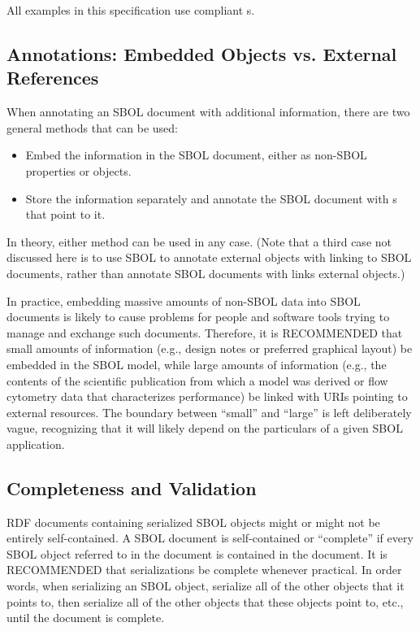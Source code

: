 All examples in this specification use compliant s.

\subsection{Annotations: Embedded Objects vs. External References}

When annotating an SBOL document with additional information, there are
two general methods that can be used:
\begin{itemize}
\item Embed the information in the SBOL document, either as non-SBOL
  properties or  objects.
\item Store the information separately and annotate the SBOL document
  with s that point to it.
\end{itemize}
In theory, either method can be used in any case. (Note that a third case not
discussed here is to use SBOL to annotate external objects with linking
to SBOL documents, rather than annotate SBOL documents with links external objects.)

In practice, 
embedding massive amounts of non-SBOL data into SBOL documents is likely
to cause problems for people and software tools trying to manage and
exchange such documents.  Therefore, it is RECOMMENDED that small amounts of information (e.g., design notes or preferred graphical layout) be embedded in the SBOL model, while large amounts of information (e.g., the contents of the scientific publication from which a model was derived or flow cytometry data that characterizes performance) be linked with URIs pointing to external resources.  The boundary between ``small'' and ``large'' is left deliberately vague, recognizing that it will likely depend on the particulars of a given SBOL application.

\subsection{Completeness and Validation}

RDF documents containing serialized SBOL objects might or might not be
entirely self-contained.  A SBOL document is self-contained or ``complete'' if every SBOL object referred to in the document is contained in the document.  It is RECOMMENDED that serializations be complete whenever practical.  In order words, when serializing an SBOL object, serialize all of the other objects that it points to, then serialize all of the other objects that these objects point to, etc., until the document is complete.

